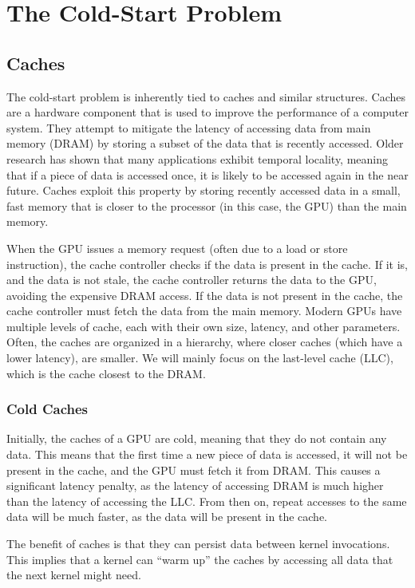 \chapter{The Cold-Start Problem}\label{ch:the-cold-start-problem}
\section{Caches}\label{sec:caches}
The cold-start problem is inherently tied to caches and similar structures.
Caches are a hardware component that is used to improve the performance of a computer system.
They attempt to mitigate the latency of accessing data from main memory (DRAM) by storing a subset of the data that is recently accessed.
Older research has shown that many applications exhibit temporal locality, meaning that if a piece of data is accessed once, it is likely to be accessed again in the near future.
Caches exploit this property by storing recently accessed data in a small, fast memory that is closer to the processor (in this case, the GPU) than the main memory.

When the GPU issues a memory request (often due to a load or store instruction), the cache controller checks if the data is present in the cache.
If it is, and the data is not stale, the cache controller returns the data to the GPU, avoiding the expensive DRAM access.
If the data is not present in the cache, the cache controller must fetch the data from the main memory.
Modern GPUs have multiple levels of cache, each with their own size, latency, and other parameters.
Often, the caches are organized in a hierarchy, where closer caches (which have a lower latency), are smaller.
We will mainly focus on the last-level cache (LLC), which is the cache closest to the DRAM\@.

\subsection{Cold Caches}\label{subsec:cold-caches}
Initially, the caches of a GPU are cold, meaning that they do not contain any data.
This means that the first time a new piece of data is accessed, it will not be present in the cache, and the GPU must fetch it from DRAM\@.
This causes a significant latency penalty, as the latency of accessing DRAM is much higher than the latency of accessing the LLC\@.
From then on, repeat accesses to the same data will be much faster, as the data will be present in the cache.

The benefit of caches is that they can persist data between kernel invocations.
This implies that a kernel can ``warm up'' the caches by accessing all data that the next kernel might need.

